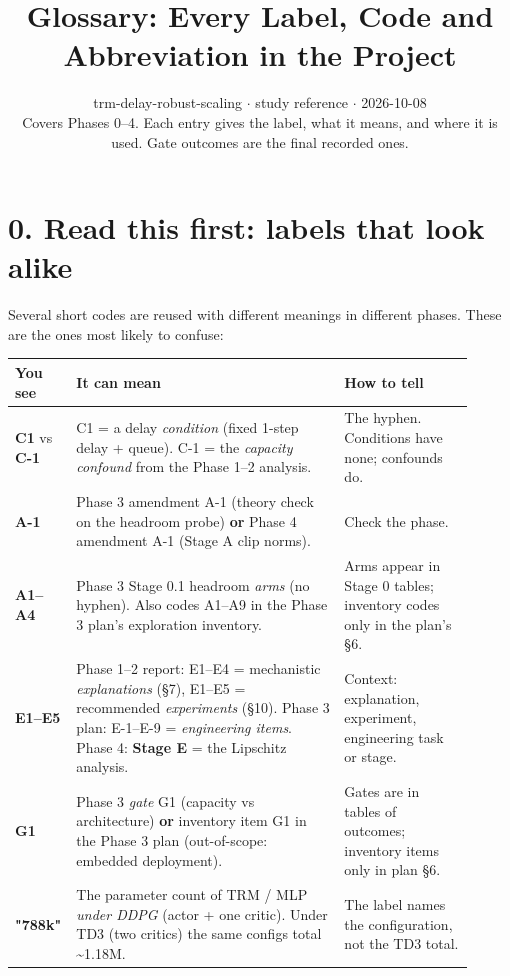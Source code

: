 \documentclass[11pt]{article}
\title{Glossary: Every Label, Code and Abbreviation in the Project}
\author{}
\date{trm-delay-robust-scaling $\cdot$ study reference $\cdot$ 2026-10-08\\[2pt]Covers Phases 0--4. Each entry gives the label, what it means, and where it is used. Gate outcomes are the final recorded ones.}
\begin{document}
\maketitle
\tableofcontents
\clearpage



\section*{0. Read this first: labels that look alike}



Several short codes are reused with different meanings in different phases. These are the ones most likely to confuse:



\begin{center}\small\begin{tabular}{>{\raggedright\arraybackslash}p{0.069\linewidth}>{\raggedright\arraybackslash}p{0.563\linewidth}>{\raggedright\arraybackslash}p{0.274\linewidth}}
\toprule
You see & It can mean & How to tell \\
\midrule
\textbf{C1} vs \textbf{C-1} & C1 = a delay \emph{condition} (fixed 1-step delay + queue). C-1 = the \emph{capacity confound} from the Phase 1--2 analysis. & The hyphen. Conditions have none; confounds do. \\
\textbf{A-1} & Phase 3 amendment A-1 (theory check on the headroom probe) \textbf{or} Phase 4 amendment A-1 (Stage A clip norms). & Check the phase. \\
\textbf{A1--A4} & Phase 3 Stage 0.1 headroom \emph{arms} (no hyphen). Also codes A1--A9 in the Phase 3 plan's exploration inventory. & Arms appear in Stage 0 tables; inventory codes only in the plan's \S{}6. \\
\textbf{E1--E5} & Phase 1--2 report: E1--E4 = mechanistic \emph{explanations} (\S{}7), E1--E5 = recommended \emph{experiments} (\S{}10). Phase 3 plan: E-1--E-9 = \emph{engineering items}. Phase 4: \textbf{Stage E} = the Lipschitz analysis. & Context: explanation, experiment, engineering task or stage. \\
\textbf{G1} & Phase 3 \emph{gate} G1 (capacity vs architecture) \textbf{or} inventory item G1 in the Phase 3 plan (out-of-scope: embedded deployment). & Gates are in tables of outcomes; inventory items only in plan \S{}6. \\
\textbf{"788k"} & The parameter count of TRM / MLP \emph{under DDPG} (actor + one critic). Under TD3 (two critics) the same configs total \textasciitilde{}1.18M. & The label names the configuration, not the TD3 total. \\

\end{tabular}
\end{center}
\end{document}
